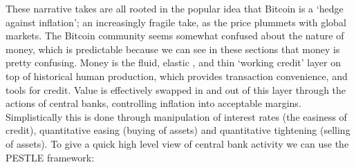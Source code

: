 These narrative takes are all rooted in the popular idea that Bitcoin is a `hedge against inflation'; an increasingly fragile take, as the price plummets with global markets. The Bitcoin community seems somewhat confused about the nature of money, which is predictable because we can see in these sections that money is pretty confusing. Money is the fluid, elastic \cite{cagan1958demand}, and thin `working credit' layer on top of historical human production, which provides transaction convenience, and tools for credit. Value is effectively swapped in and out of this layer through the actions of central banks, controlling inflation into acceptable margins. Simplistically this is done through manipulation of interest rates (the easiness of credit), quantitative easing (buying of assets) and quantitative tightening (selling of assets). To give a quick high level view of central bank activity we can use the PESTLE framework:
